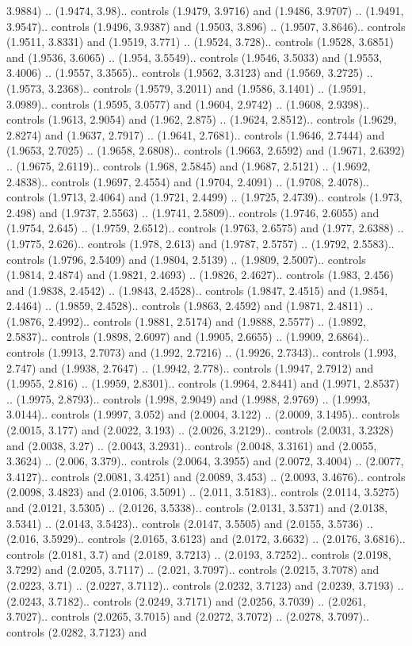 3.9884) .. (1.9474, 3.98).. controls (1.9479, 3.9716) and (1.9486, 3.9707) .. (1.9491, 3.9547).. controls (1.9496, 3.9387) and (1.9503, 3.896) .. (1.9507, 3.8646).. controls (1.9511, 3.8331) and (1.9519, 3.771) .. (1.9524, 3.728).. controls (1.9528, 3.6851) and (1.9536, 3.6065) .. (1.954, 3.5549).. controls (1.9546, 3.5033) and (1.9553, 3.4006) .. (1.9557, 3.3565).. controls (1.9562, 3.3123) and (1.9569, 3.2725) .. (1.9573, 3.2368).. controls (1.9579, 3.2011) and (1.9586, 3.1401) .. (1.9591, 3.0989).. controls (1.9595, 3.0577) and (1.9604, 2.9742) .. (1.9608, 2.9398).. controls (1.9613, 2.9054) and (1.962, 2.875) .. (1.9624, 2.8512).. controls (1.9629, 2.8274) and (1.9637, 2.7917) .. (1.9641, 2.7681).. controls (1.9646, 2.7444) and (1.9653, 2.7025) .. (1.9658, 2.6808).. controls (1.9663, 2.6592) and (1.9671, 2.6392) .. (1.9675, 2.6119).. controls (1.968, 2.5845) and (1.9687, 2.5121) .. (1.9692, 2.4838).. controls (1.9697, 2.4554) and (1.9704, 2.4091) .. (1.9708, 2.4078).. controls (1.9713, 2.4064) and (1.9721, 2.4499) .. (1.9725, 2.4739).. controls (1.973, 2.498) and (1.9737, 2.5563) .. (1.9741, 2.5809).. controls (1.9746, 2.6055) and (1.9754, 2.645) .. (1.9759, 2.6512).. controls (1.9763, 2.6575) and (1.977, 2.6388) .. (1.9775, 2.626).. controls (1.978, 2.613) and (1.9787, 2.5757) .. (1.9792, 2.5583).. controls (1.9796, 2.5409) and (1.9804, 2.5139) .. (1.9809, 2.5007).. controls (1.9814, 2.4874) and (1.9821, 2.4693) .. (1.9826, 2.4627).. controls (1.983, 2.456) and (1.9838, 2.4542) .. (1.9843, 2.4528).. controls (1.9847, 2.4515) and (1.9854, 2.4464) .. (1.9859, 2.4528).. controls (1.9863, 2.4592) and (1.9871, 2.4811) .. (1.9876, 2.4992).. controls (1.9881, 2.5174) and (1.9888, 2.5577) .. (1.9892, 2.5837).. controls (1.9898, 2.6097) and (1.9905, 2.6655) .. (1.9909, 2.6864).. controls (1.9913, 2.7073) and (1.992, 2.7216) .. (1.9926, 2.7343).. controls (1.993, 2.747) and (1.9938, 2.7647) .. (1.9942, 2.778).. controls (1.9947, 2.7912) and (1.9955, 2.816) .. (1.9959, 2.8301).. controls (1.9964, 2.8441) and (1.9971, 2.8537) .. (1.9975, 2.8793).. controls (1.998, 2.9049) and (1.9988, 2.9769) .. (1.9993, 3.0144).. controls (1.9997, 3.052) and (2.0004, 3.122) .. (2.0009, 3.1495).. controls (2.0015, 3.177) and (2.0022, 3.193) .. (2.0026, 3.2129).. controls (2.0031, 3.2328) and (2.0038, 3.27) .. (2.0043, 3.2931).. controls (2.0048, 3.3161) and (2.0055, 3.3624) .. (2.006, 3.379).. controls (2.0064, 3.3955) and (2.0072, 3.4004) .. (2.0077, 3.4127).. controls (2.0081, 3.4251) and (2.0089, 3.453) .. (2.0093, 3.4676).. controls (2.0098, 3.4823) and (2.0106, 3.5091) .. (2.011, 3.5183).. controls (2.0114, 3.5275) and (2.0121, 3.5305) .. (2.0126, 3.5338).. controls (2.0131, 3.5371) and (2.0138, 3.5341) .. (2.0143, 3.5423).. controls (2.0147, 3.5505) and (2.0155, 3.5736) .. (2.016, 3.5929).. controls (2.0165, 3.6123) and (2.0172, 3.6632) .. (2.0176, 3.6816).. controls (2.0181, 3.7) and (2.0189, 3.7213) .. (2.0193, 3.7252).. controls (2.0198, 3.7292) and (2.0205, 3.7117) .. (2.021, 3.7097).. controls (2.0215, 3.7078) and (2.0223, 3.71) .. (2.0227, 3.7112).. controls (2.0232, 3.7123) and (2.0239, 3.7193) .. (2.0243, 3.7182).. controls (2.0249, 3.7171) and (2.0256, 3.7039) .. (2.0261, 3.7027).. controls (2.0265, 3.7015) and (2.0272, 3.7072) .. (2.0278, 3.7097).. controls (2.0282, 3.7123) and 
